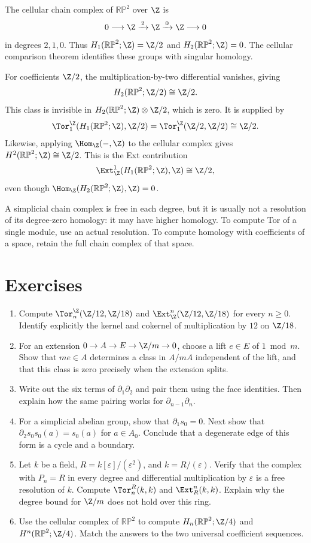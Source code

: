 \documentclass[11pt]{article}
\begin{document}
\begin{example}
The cellular chain complex of $\mathbb{RP}^2$ over $\Z$ is
\[
0\longrightarrow\Z\xrightarrow{\,2\,}\Z\xrightarrow{\,0\,}\Z\longrightarrow0
\]
in degrees $2,1,0$. Thus $H_1(\mathbb{RP}^2;\Z)=\Z/2$ and $H_2(\mathbb{RP}^2;\Z)=0$. The cellular comparison theorem identifies these groups with singular homology.

For coefficients $\Z/2$, the multiplication-by-two differential vanishes, giving
\[
H_2(\mathbb{RP}^2;\Z/2)\cong\Z/2.
\]
This class is invisible in $H_2(\mathbb{RP}^2;\Z)\otimes\Z/2$, which is zero. It is supplied by
\[
\Tor_1^{\Z}(H_1(\mathbb{RP}^2;\Z),\Z/2)
=\Tor_1^{\Z}(\Z/2,\Z/2)\cong\Z/2.
\]
Likewise, applying $\Hom_{\Z}(-,\Z)$ to the cellular complex gives $H^2(\mathbb{RP}^2;\Z)\cong\Z/2$. This is the Ext contribution
\[
\Ext_{\Z}^1(H_1(\mathbb{RP}^2;\Z),\Z)\cong\Z/2,
\]
even though $\Hom_{\Z}(H_2(\mathbb{RP}^2;\Z),\Z)=0$.
\end{example}
A simplicial chain complex is free in each degree, but it is usually not a resolution of its degree-zero homology: it may have higher homology. To compute Tor of a single module, use an actual resolution. To compute homology with coefficients of a space, retain the full chain complex of that space.

\section{Exercises}
\begin{enumerate}
\item Compute $\Tor_n^{\Z}(\Z/12,\Z/18)$ and $\Ext_{\Z}^n(\Z/12,\Z/18)$ for every $n\geq0$. Identify explicitly the kernel and cokernel of multiplication by $12$ on $\Z/18$.
\item For an extension $0\to A\to E\to\Z/m\to0$, choose a lift $e\in E$ of $1\bmod m$. Show that $me\in A$ determines a class in $A/mA$ independent of the lift, and that this class is zero precisely when the extension splits.
\item Write out the six terms of $\partial_1\partial_2$ and pair them using the face identities. Then explain how the same pairing works for $\partial_{n-1}\partial_n$.
\item For a simplicial abelian group, show that $\partial_1s_0=0$. Next show that $\partial_2s_0s_0(a)=s_0(a)$ for $a\in A_0$. Conclude that a degenerate edge of this form is a cycle and a boundary.
\item Let $k$ be a field, $R=k[\varepsilon]/(\varepsilon^2)$, and $k=R/(\varepsilon)$. Verify that the complex with $P_n=R$ in every degree and differential multiplication by $\varepsilon$ is a free resolution of $k$. Compute $\Tor_n^R(k,k)$ and $\Ext_R^n(k,k)$. Explain why the degree bound for $\Z/m$ does not hold over this ring.
\item Use the cellular complex of $\mathbb{RP}^2$ to compute $H_n(\mathbb{RP}^2;\Z/4)$ and $H^n(\mathbb{RP}^2;\Z/4)$. Match the answers to the two universal coefficient sequences.
\end{enumerate}
\end{document}

